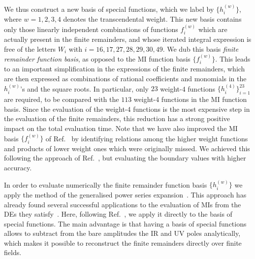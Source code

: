 \documentclass[main.tex]{subfiles}
\begin{document}
We thus construct a new basis of special functions, which we label by $\{h^{(w)}_i\}$, where $w=1,2,3,4$ denotes the transcendental weight. This new basis contains only those linearly independent combinations of functions $f^{(w)}_i$ which are actually present in the finite remainders, and whose iterated integral expression is free of the letters $W_i$ with $i=16,17,27,28,29,30,49$. We dub this basis \textit{finite remainder function basis}, as opposed to the MI function basis $\{f^{(w)}_i\}$. This leads to an important simplification in the expressions of the finite remainders, which are then expressed as combinations of rational coefficients and monomials in the $h^{(w)}_i$'s and the square roots. In particular, only $23$ weight-4 functions $\{h^{(4)}_i\}_{i=1}^{23}$ are required, to be compared with the $113$ weight-4 functions in the MI function basis. Since the evaluation of the weight-4 functions is the most expensive step in the evaluation of the finite remainders, this reduction has a strong positive impact on the total evaluation time. Note that we have also improved the MI basis $\{f^{(w)}_i\}$ of Ref.~\cite{Badger:2021nhg} by identifying relations among the higher weight functions and products of lower weight ones which were originally missed. We achieved this following the approach of Ref.~\cite{Badger:2021nhg}, but evaluating the boundary values with higher accuracy.

In order to evaluate numerically the finite remainder function basis $\{h^{(w)}_i\}$ we apply the method of the generalised power series expansion~\cite{Francesco:2019yqt}. This approach has already found several successful applications to the evaluation of MIs from the DEs they satisfy~\cite{Francesco:2019yqt,Bonciani:2019jyb,Frellesvig:2019byn,Abreu:2020jxa,Becchetti:2020wof,Bonciani:2021zzf,abreu2021twoloop}. Here, following Ref.~\cite{Badger:2021nhg}, we apply it directly to the basis of special functions. The main advantage is that having a basis of special functions allows to subtract from the bare amplitudes the IR and UV poles analytically, which makes it possible to reconstruct the finite remainders directly over finite fields. 
\end{document}

